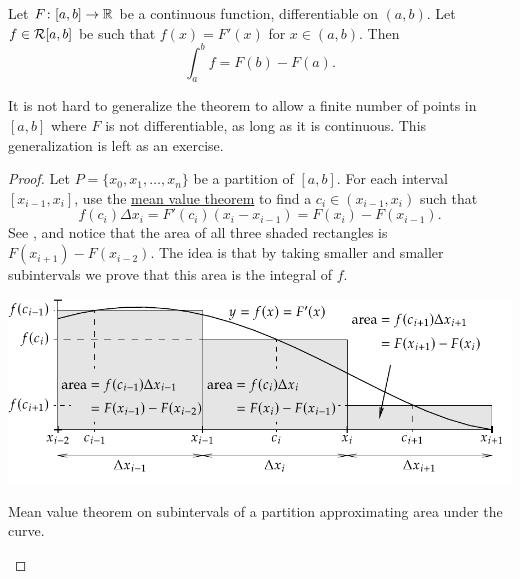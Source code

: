\begin{thm} \label{thm:FTCv1}
Let $F \colon [a,b] \to {\mathbb{R}}$ be a continuous function, differentiable
on $(a,b)$.  Let $f \in {\mathcal{R}}[a,b]$ be such that $f(x) = F'(x)$ for $x \in
(a,b)$.  Then
\begin{equation*}
\int_a^b f = F(b)-F(a) .
\end{equation*}
\end{thm}

It is not hard to generalize the theorem to allow a finite number of points
in $[a,b]$ where $F$ is not differentiable, as long as it is continuous.
This generalization is left as an exercise.

\begin{proof}
Let $P = \{ x_0, x_1, \ldots, x_n \}$ be a partition of $[a,b]$.
For each interval $[x_{i-1},x_i]$, use the
\hyperref[thm:mvt]{mean value theorem} to find a
$c_i \in (x_{i-1},x_i)$ such that
\begin{equation*}
f(c_i) \Delta x_i = F'(c_i) (x_i - x_{i-1}) = F(x_i) - F(x_{i-1}) .
\end{equation*}
See , and
notice that the area of all
three shaded rectangles is $F(x_{i+1})-F(x_{i-2})$.
The idea is that by taking smaller and smaller subintervals
we prove that this area is the integral of $f$.
\begin{myfigureht}
\includegraphics{figures/fundthmfig}
\caption{Mean value theorem on subintervals of a partition
approximating area under the curve.\label{fig:fundthmfig}}
\end{myfigureht}


\end{proof}
